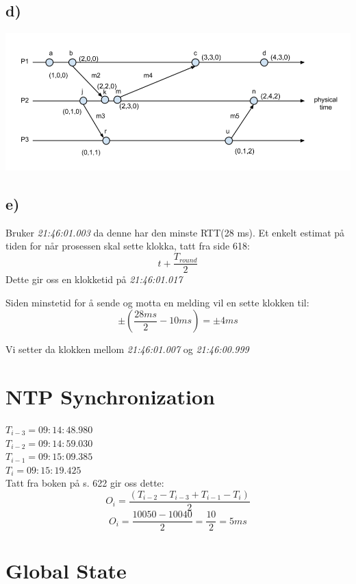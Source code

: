 \documentclass{article}
\begin{document}
\subsection*{d)}
\includegraphics[scale=0.5]{Images/vector}
\subsection*{e)}
Bruker \emph{21:46:01.003} da denne har den minste RTT(28 ms). Et enkelt estimat på tiden for når prosessen skal sette klokka, tatt fra side 618: $$t + \frac{T_{round}}{2}$$ Dette gir oss en klokketid på \emph{21:46:01.017}

Siden minstetid for å sende og motta en melding vil en sette klokken til:
$$\pm (\frac{28 ms}{2} - 10 ms) = \pm 4 ms$$

Vi setter da klokken mellom \emph{21:46:01.007} og \emph{21:46:00.999}

\section{NTP Synchronization}
$T_{i-3} = 09:14:48.980$\\
$T_{i-2} = 09:14:59.030$\\
$T_{i-1} = 09:15:09.385$\\
$T_{i} = 09:15:19.425$\\

Tatt fra boken på s. 622 gir oss dette:
$$O_i = \frac{(T_{i-2} - T_{i-3} + T_{i-1} - T_i)}{2}$$
$$O_i = \frac{10050-10040}{2} = \frac{10}{2} = 5 ms$$
\section{Global State}
\end{document}
